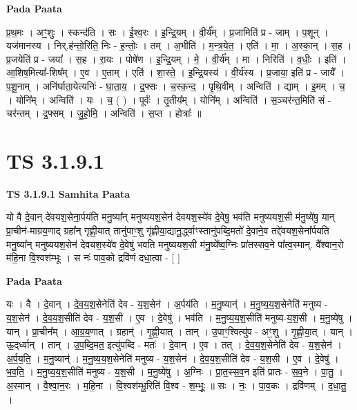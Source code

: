 \documentclass[17pt]{extarticle}
\begin{document}
\textbf{Pada Paata} \newline

प्र॒थ॒मः । अꣳ॒॒शुः । स्कन्द॑ति । सः । ई॒श्व॒रः । इ॒न्द्रि॒यम् । वी॒र्य᳚म् । प्र॒जामिति॑ प्र - जाम् । प॒शून् । यज॑मानस्य । निर्.ह॑न्तो॒रिति॒ निः - ह॒न्तोः॒ । तम् । अ॒भीति॑ । म॒न्त्र॒ये॒त॒ । एति॑ । मा॒ । अ॒स्का॒न् । स॒ह । प्र॒जयेति॑ प्र - जया᳚ । स॒ह । रा॒यः । पोषे॑ण । इ॒न्द्रि॒यम् । मे॒ । वी॒र्य᳚म् । मा । निरिति॑ । व॒धीः॒ । इति॑ । आ॒शिष॒मित्या᳚-शिष᳚म् । ए॒व । ए॒ताम् । एति॑ । शा॒स्ते॒ । इ॒न्द्रि॒यस्य॑ । वी॒र्य॑स्य । प्र॒जाया॒ इति॑ प्र - जायै᳚ । प॒शू॒नाम् । अनि॑र्घाता॒येत्यनिः॑ - घा॒ता॒य॒ । द्र॒फ्सः । च॒स्क॒न्द॒ । पृ॒थि॒वीम् । अन्विति॑ । द्याम् । इ॒मम् । च॒ । योनि᳚म् । अन्विति॑ । यः । च॒ ( ) । पूर्वः॑ । तृ॒तीय᳚म् । योनि᳚म् । अन्विति॑ । स॒ञ्चर॑न्त॒मिति॑ सं - चर॑न्तम् । द्र॒फ्सम् । जु॒हो॒मि॒ । अन्विति॑ । स॒प्त । होत्राः᳚ ॥  \newline




\section*{ TS 3.1.9.1 }

\textbf{TS 3.1.9.1 } \newline
\textbf{Samhita Paata} \newline

यो वै दे॒वान् दे॑वयश॒सेना॒र्पय॑ति मनु॒ष्या᳚न् मनुष्ययश॒सेन॑ देवयश॒स्ये॑व दे॒वेषु॒ भव॑ति मनुष्ययश॒सी म॑नु॒ष्ये॑षु॒ यान् प्रा॒चीन॑-माग्रय॒णाद् ग्रहा᳚न् गृह्णी॒यात् तानु॑पाꣳ॒॒शु गृ॑ह्णीया॒द्यानू॒र्द्ध्वाꣳस्तानु॑पब्दि॒मतो॑ दे॒वाने॒व तद्दे॑वयश॒सेना᳚र्पयति मनु॒ष्या᳚न् मनुष्ययश॒सेन॑ देवयश॒स्ये॑व दे॒वेषु॑ भवति मनुष्ययश॒सी म॑नु॒ष्ये᳚ष्व॒ग्निः प्रा॑तस्सव॒ने पा᳚त्व॒स्मान्. वै᳚श्वान॒रो म॑हि॒ना वि॒श्वश॑म्भूः । स नः॑ पाव॒को द्रवि॑णं दधा॒त्वा - [  ] \newline

\textbf{Pada Paata} \newline

यः । वै । दे॒वान् । दे॒व॒य॒श॒सेनेति॑ देव - य॒श॒सेन॑ । अ॒र्पय॑ति । म॒नु॒ष्यान्॑ । म॒नु॒ष्य॒य॒श॒सेनेति॑ मनुष्य - य॒श॒सेन॑ । दे॒व॒य॒श॒सीति॑ देव - य॒श॒सी । ए॒व । दे॒वेषु॑ । भव॑ति । म॒नु॒ष्य॒य॒श॒सीति॑ मनुष्य-य॒श॒सी । म॒नु॒ष्ये॑षु । यान् । प्रा॒चीन᳚म् । आ॒ग्र॒य॒णात् । ग्रहान्॑ । गृ॒ह्णी॒यात् । तान् । उ॒पाꣳ॒॒श्वित्यु॑प - अꣳ॒॒शु । गृ॒ह्णी॒या॒त् । यान् । ऊ॒द्‌र्ध्वान् । तान् । उ॒प॒ब्दि॒मत॒ इत्यु॑पब्दि - मतः॑ । दे॒वान् । ए॒व । तत् । दे॒व॒य॒श॒सेनेति॑ देव - य॒श॒सेन॑ । अ॒र्प॒य॒ति॒ । म॒नु॒ष्यान्॑ । म॒नु॒ष्य॒य॒श॒सेनेति॑ मनुष्य - य॒श॒सेन॑ । दे॒व॒य॒श॒सीति॑ देव - य॒श॒सी । ए॒व । दे॒वेषु॑ । भ॒व॒ति॒ । म॒नु॒ष्य॒य॒श॒सीति॑ मनुष्य - य॒श॒सी । म॒नु॒ष्ये॑षु । अ॒ग्निः । प्रा॒त॒स्स॒व॒न इति॑ प्रातः - स॒व॒ने । पा॒तु॒ ।अ॒स्मान् । वै॒श्वा॒न॒रः । म॒हि॒ना । वि॒श्वश॑म्भू॒रिति॑ वि॒श्व - श॒म्भूः॒ ॥ सः । नः॒ । पा॒व॒कः । द्रवि॑णम् । द॒धा॒तु॒ ।  \newline
\end{document}
